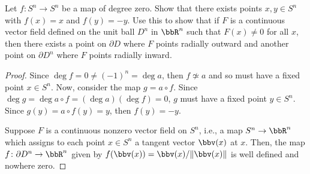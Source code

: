 \begin{problem}[Hatcher {\S}2.2, Ex.\@ 3]
Let $f\colon S^n\to S^n$ be a map of degree zero. Show that there exists
points $x,y\in S^n$ with $f(x)=x$ and $f(y)=-y$. Use this to show that if
$F$ is a continuous vector field defined on the unit ball $D^n$ in $\bbR^n$
such that $F(x)\neq 0$ for all $x$, then there exists a point on $\partial
D$ where $F$ points radially outward and another point on $\partial D^n$
where  $F$ points radially inward.
\end{problem}
\begin{proof}
Since $\deg f=0\neq (-1)^n=\deg a$, then $f\nsimeq a$ and so must have a
fixed point $x\in S^n$. Now, consider the map $g= a\circ f$. Since
$\deg g=\deg a\circ f=(\deg a)(\deg f)=0$, $g$ must have a fixed point
$y\in S^n$. Since $g(y)=a\circ f(y)=y$, then $f(y)=-y$.

Suppose $F$ is a continuous nonzero vector field on $S^n$, i.e., a map
$S^n\to\bbR^n$ which assigns to each point $x\in S^n$ a tangent vector
$\bbv(x)$ at $x$. Then, the map $f\colon\partial D^n\to\bbR^n$ given by
$f(\bbv(x))=\bbv(x)/\|\bbv(x)\|$ is well defined and nowhere zero.
\end{proof}
\newpage


